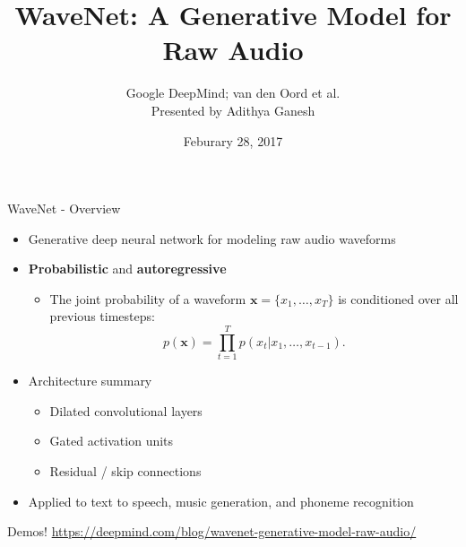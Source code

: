 \documentclass{beamer}
\title{WaveNet: A Generative Model for Raw Audio}
\date{Feburary 28, 2017}
\author{Google DeepMind; van den Oord et al.\\ Presented by Adithya Ganesh}
\institute{Kundaje Lab Journal Club, Stanford University}
\begin{document}
  \maketitle
  \begin{frame}{WaveNet - Overview}
    \begin{itemize}
      \item Generative deep neural network for modeling raw audio waveforms
      \item \textbf{Probabilistic} and \textbf{autoregressive}
        \begin{itemize}
          \item The joint probability of a waveform $\mathbf{x} = \{ x_1, \dots, x_T \}$ is conditioned over all previous timesteps:
            \[
              p(\mathbf{x}) = \prod_{t=1}^T p(x_t | x_1, \dots, x_{t-1}).
            \]


        \end{itemize}

      \item Architecture summary
        \begin{itemize}
          \item Dilated convolutional layers
          \item Gated activation units
          \item Residual / skip connections
        \end{itemize}

      \item Applied to text to speech, music generation, and phoneme recognition

    \end{itemize}
  \end{frame}

  \begin{frame}{Demos!}
\url{https://deepmind.com/blog/wavenet-generative-model-raw-audio/}
  \end{frame}
\end{document}
